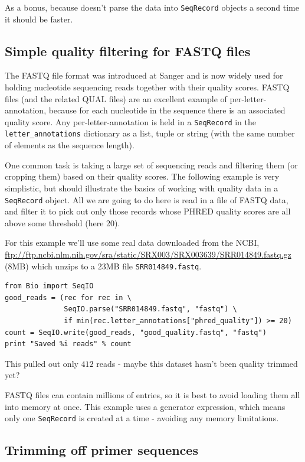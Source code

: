 \documentclass{report}
\begin{document}
As a bonus, because doesn't parse the data into \verb|SeqRecord| objects
a second time it should be faster.

\subsection{Simple quality filtering for FASTQ files}
\label{sec:FASTQ-filtering-example}

The FASTQ file format was introduced at Sanger and is now widely used for
holding nucleotide sequencing reads together with their quality scores.
FASTQ files (and the related QUAL files) are an excellent example of
per-letter-annotation, because for each nucleotide in the sequence there is
an associated quality score.  Any per-letter-annotation is held in a
\verb|SeqRecord| in the \verb|letter_annotations| dictionary as a list,
tuple or string (with the same number of elements as the sequence length).

One common task is taking a large set of sequencing reads and filtering them
(or cropping them) based on their quality scores.
The following example is very simplistic, but should illustrate the basics of
working with quality data in a \verb|SeqRecord| object.  All we are going to
do here is read in a file of FASTQ data, and filter it to pick out only those
records whose PHRED quality scores are all above some threshold (here 20).

For this example we'll use some real data downloaded from the NCBI,
\url{ftp://ftp.ncbi.nlm.nih.gov/sra/static/SRX003/SRX003639/SRR014849.fastq.gz}
(8MB) which unzips to a 23MB file \texttt{SRR014849.fastq}.

\begin{verbatim}
from Bio import SeqIO
good_reads = (rec for rec in \
              SeqIO.parse("SRR014849.fastq", "fastq") \
              if min(rec.letter_annotations["phred_quality"]) >= 20)
count = SeqIO.write(good_reads, "good_quality.fastq", "fastq")
print "Saved %i reads" % count
\end{verbatim}

\noindent This pulled out only $412$ reads - maybe this dataset hasn't been
quality trimmed yet?

FASTQ files can contain millions of entries, so it is best to avoid loading
them all into memory at once.  This example uses a generator expression, which
means only one \verb|SeqRecord| is created at a time - avoiding any memory
limitations.

\subsection{Trimming off primer sequences}
\label{sec:FASTQ-slicing-off-primer}
\end{document}
